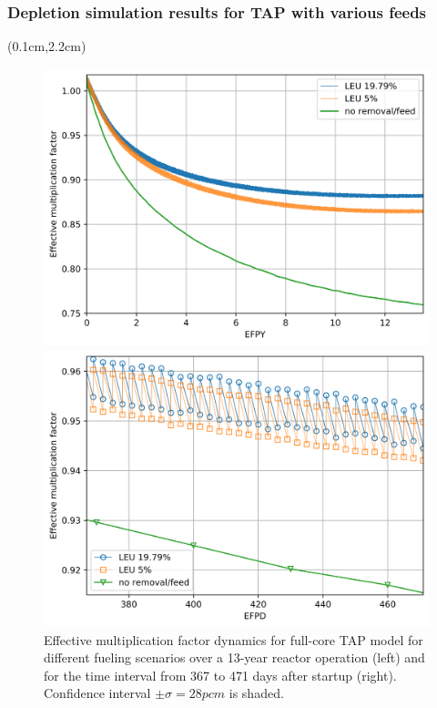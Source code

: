 \begin{frame}
\frametitle{Depletion simulation results for TAP with various feeds}       
\begin{textblock*}{12.6cm}(0.1cm,2.2cm) %
	\begin{figure}[htp!] %
		\begin{minipage}[b]{0.48\textwidth}
			\includegraphics[width=\linewidth]{../figures/keff_3.png}
		\end{minipage}
			\hspace{-2mm}
		\begin{minipage}[b]{0.48\textwidth}
			\includegraphics[width=\linewidth]{../figures/keff_zoomed_2.png}
		\end{minipage}
		\caption{Effective multiplication factor dynamics for full-core
		\gls{TAP} model for different fueling scenarios over a 13-year reactor 
		operation (left) and for the time interval from 367 to 471 days after 
		startup (right). Confidence interval $\pm\sigma=28pcm$ is shaded.}
	\end{figure}
\end{textblock*}
\end{frame}


